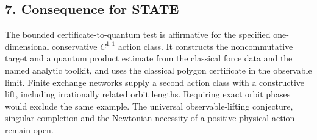 \documentclass[11pt,a4paper]{article}
\begin{document}
\subsection{7. Consequence for STATE}\label{consequence-for-state}

The bounded certificate-to-quantum test is affirmative for the specified
one-dimensional conservative \(C^{1,1}\) action class. It constructs the
noncommutative target and a quantum product estimate from the classical
force data and the named analytic toolkit, and uses the classical
polygon certificate in the observable limit. Finite exchange networks
supply a second action class with a constructive lift, including
irrationally related orbit lengths. Requiring exact orbit phases would
exclude the same example. The universal observable-lifting conjecture,
singular completion and the Newtonian necessity of a positive physical
action remain open.
\end{document}
